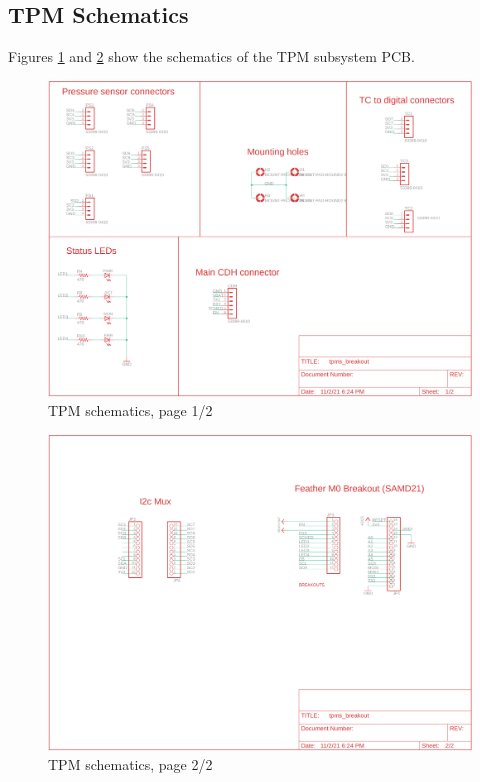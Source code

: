 \documentclass{article}
\begin{document}
\newpage
\subsection{TPM Schematics}
Figures \ref{fig:schematic-tpm-p1} and \ref{fig:schematic-tpm-p2} show the schematics of the TPM subsystem PCB.
\begin{figure}[H]
	\centering
	\includegraphics[width=\textwidth]{images/tpms_breakout_schem_1}
	\caption{TPM schematics, page 1/2}
	\label{fig:schematic-tpm-p1}
\end{figure}
\begin{figure}[H]
	\centering
	\includegraphics[width=\textwidth]{images/tpms_breakout_schem_2}
	\caption{TPM schematics, page 2/2}
	\label{fig:schematic-tpm-p2}
\end{figure}
\end{document}
